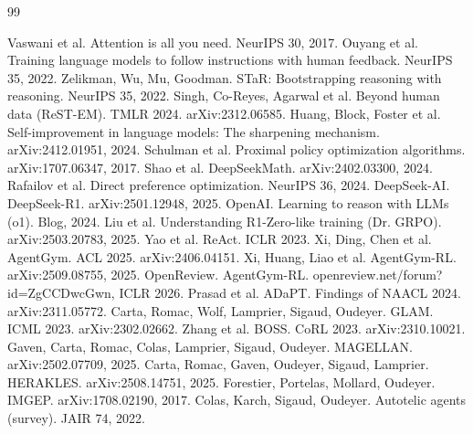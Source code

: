 \begin{thebibliography}{99}

 Vaswani et al. Attention is all you need. NeurIPS 30, 2017.
 Ouyang et al. Training language models to follow instructions with human feedback. NeurIPS 35, 2022.
 Zelikman, Wu, Mu, Goodman. STaR: Bootstrapping reasoning with reasoning. NeurIPS 35, 2022.
 Singh, Co-Reyes, Agarwal et al. Beyond human data (ReST-EM). TMLR 2024. arXiv:2312.06585.
 Huang, Block, Foster et al. Self-improvement in language models: The sharpening mechanism. arXiv:2412.01951, 2024.
 Schulman et al. Proximal policy optimization algorithms. arXiv:1707.06347, 2017.
 Shao et al. DeepSeekMath. arXiv:2402.03300, 2024.
 Rafailov et al. Direct preference optimization. NeurIPS 36, 2024.
 DeepSeek-AI. DeepSeek-R1. arXiv:2501.12948, 2025.
 OpenAI. Learning to reason with LLMs (o1). Blog, 2024.
 Liu et al. Understanding R1-Zero-like training (Dr. GRPO). arXiv:2503.20783, 2025.
 Yao et al. ReAct. ICLR 2023.
 Xi, Ding, Chen et al. AgentGym. ACL 2025. arXiv:2406.04151.
 Xi, Huang, Liao et al. AgentGym-RL. arXiv:2509.08755, 2025.
 OpenReview. AgentGym-RL. openreview.net/forum?id=ZgCCDwcGwn, ICLR 2026.
 Prasad et al. ADaPT. Findings of NAACL 2024. arXiv:2311.05772.
 Carta, Romac, Wolf, Lamprier, Sigaud, Oudeyer. GLAM. ICML 2023. arXiv:2302.02662.
 Zhang et al. BOSS. CoRL 2023. arXiv:2310.10021.
 Gaven, Carta, Romac, Colas, Lamprier, Sigaud, Oudeyer. MAGELLAN. arXiv:2502.07709, 2025.
 Carta, Romac, Gaven, Oudeyer, Sigaud, Lamprier. HERAKLES. arXiv:2508.14751, 2025. %
 Forestier, Portelas, Mollard, Oudeyer. IMGEP. arXiv:1708.02190, 2017.
 Colas, Karch, Sigaud, Oudeyer. Autotelic agents (survey). JAIR 74, 2022.

\end{thebibliography}
